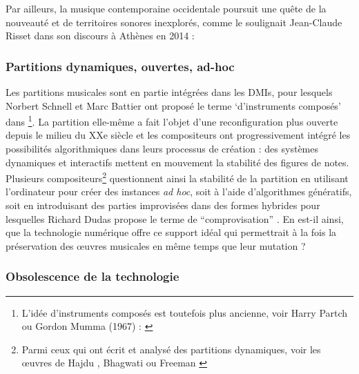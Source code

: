 Par ailleurs, la musique contemporaine occidentale poursuit une quête de la nouveauté et de territoires sonores inexplorés, comme le soulignait Jean-Claude Risset dans son discours à Athènes en 2014 \cite{risset_sound_2014}: 

\subsubsection{Partitions dynamiques, ouvertes, ad-hoc}

\noindent Les partitions musicales sont en partie intégrées dans les \glspl{DMI}, pour lesquels Norbert Schnell et Marc Battier ont proposé le terme `d'instruments composés' dans \cite{schnell_introducing_2002}\footnote{L'idée d'instruments composés est toutefois plus ancienne, voir Harry Partch ou Gordon Mumma (1967) : \cite{mumma_creative_1967}}. La partition elle-même a fait l'objet d'une reconfiguration plus ouverte depuis le milieu du XXe siècle et les compositeurs ont progressivement intégré les possibilités algorithmiques dans leurs processus de création : des systèmes dynamiques et interactifs mettent en mouvement la stabilité des figures de notes. Plusieurs compositeurs\footnote{Parmi ceux qui ont écrit et analysé des partitions dynamiques, voir les œuvres de Hajdu \cite{hajdu_disdisposable_2016}, Bhagwati \cite{bhagwati_vexations_2017} ou Freeman \cite{freeman_extreme_2008}} questionnent ainsi la stabilité de la partition en utilisant l'ordinateur pour créer des instances \textit{ad hoc}, soit à l'aide d'algorithmes génératifs, soit en introduisant des parties improvisées dans des formes hybrides pour lesquelles Richard Dudas propose le terme de ``comprovisation'' \cite{dudas_comprovisation:_2010}. En est-il ainsi, que la technologie numérique offre ce support idéal qui permettrait à la fois la préservation des œuvres musicales en même temps que leur mutation ?

\subsubsection{Obsolescence de la technologie}

